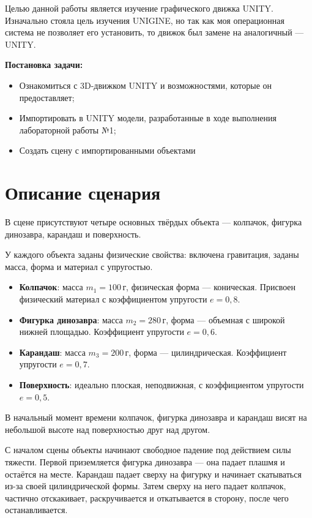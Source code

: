 \documentclass[a4paper,12pt]{article}
\begin{document}
	Целью данной работы является изучение графического движка UNITY. Изначально стояла цель изучения UNIGINE, но так как моя операционная система не позволяет его установить, то движок был замене на аналогичный — UNITY.
	
	\textbf{Постановка задачи:}
	\begin{itemize}
		\item Ознакомиться с 3D-движком UNITY и возможностями, которые он предоставляет;
		 \item Импортировать в UNITY модели, разработанные в ходе выполнения лабораторной работы №1;
		  \item Создать сцену с импортированными объектами
	\end{itemize}
	
	\newpage
\section{Описание сценария}

В сцене присутствуют четыре основных твёрдых объекта — колпачок, фигурка динозавра, карандаш и поверхность.

У каждого объекта заданы физические свойства: включена гравитация, заданы масса, форма и материал с упругостью.

\begin{itemize}
    \item \textbf{Колпачок}: масса $m_1 = 100\,$г, физическая форма — коническая. Присвоен физический материал с коэффициентом упругости $e = 0{,}8$.
    \item \textbf{Фигурка динозавра}: масса $m_2 = 280\,$г, форма — объемная с широкой нижней площадью. Коэффициент упругости $e = 0{,}6$.
    \item \textbf{Карандаш}: масса $m_3 = 200\,$г, форма — цилиндрическая. Коэффициент упругости $e = 0{,}7$.
    \item \textbf{Поверхность}: идеально плоская, неподвижная, с коэффициентом упругости $e = 0{,}5$.
\end{itemize}

В начальный момент времени колпачок, фигурка динозавра и карандаш висят на небольшой высоте над поверхностью друг над другом.

С началом сцены объекты начинают свободное падение под действием силы тяжести. Первой приземляется фигурка динозавра — она падает плашмя и остаётся на месте. Карандаш падает сверху на фигурку и начинает скатываться из-за своей цилиндрической формы. Затем сверху на него падает колпачок, частично отскакивает, раскручивается и откатывается в сторону, после чего останавливается.
\end{document}
